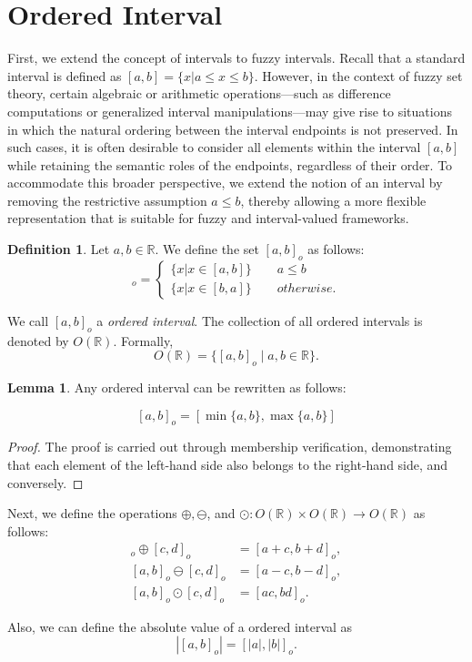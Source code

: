 \documentclass[preprint,12pt]{elsarticle}
\theoremstyle{definition}
\newtheorem{definition}{Definition}[section]
\newtheorem{lemma}{Lemma}[section]
\begin{document}
	\section{ Ordered Interval}
First, we extend the concept of intervals to fuzzy intervals.
Recall that a standard interval is defined as $[a,b]=\{x\vert a\leq x\leq b\}$.
However, in the context of fuzzy set theory, certain algebraic or arithmetic operations---such as difference computations or generalized interval manipulations---may give rise to situations in which the natural ordering between the interval endpoints is not preserved. 
In such cases, it is often desirable to consider all elements within the interval $[a, b]$ while retaining the semantic roles of the endpoints, regardless of their order. 
To accommodate this broader perspective, we extend the notion of an interval by removing the restrictive assumption $a \leq b$, thereby allowing a more flexible representation that is suitable for fuzzy and interval-valued frameworks.
\begin{definition}\label{def:Orderedinterval}
	Let $a, b \in \mathbb{R}$. We define the set $[a, b]_o$ as follows:
	\begin{equation}
		[a,b]_o=\begin{cases}
			\{x\vert x\in [a,b]\}\qquad a\leq b\\\{x\vert x\in[b,a]\}\qquad otherwise.
		\end{cases}
	\end{equation}
	
	We call $[a,b]_o$ a \emph{ordered interval}. 
	The collection of all ordered intervals is denoted by $O(\mathbb{R})$.
	Formally, 
	\[
	O(\mathbb{R}) = \{ [a, b]_o \mid a, b \in \mathbb{R} \}.
	\]
	\begin{lemma}
	Any ordered interval can be rewritten as follows:
	
	\begin{equation}\label{eq:Transformationintervalsorderedintervals}
		[a,b]_o=[\min\{a,b\},\max\{a,b\}]
	\end{equation}
			\end{lemma}
			\begin{proof}
				The proof is carried out through membership verification, demonstrating that each element of the left-hand side also belongs to the right-hand side, and conversely.
			\end{proof}
	Next, we define the operations 
	$\oplus, \ominus$, and $\odot : O(\mathbb{R}) \times O(\mathbb{R}) \to O(\mathbb{R})$ as follows:
	\begin{align}
		[a, b]_o \oplus [c, d]_o &= [a+c, b+d]_o,\\
		[a, b]_o \ominus [c, d]_o &= [a-c, b-d]_o,\\
		[a, b]_o \odot [c, d]_o &= [ac, bd]_o.
	\end{align}
	
	Also, we can define the absolute value of a ordered interval as
	\[
	|[a, b]_o| = [|a|, |b|]_o.
	\]
	
\end{definition}
\end{document}
